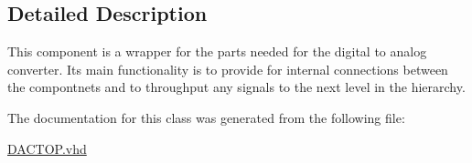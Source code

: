\subsection{Detailed Description}
This component is a wrapper for the parts needed for the digital to analog converter. Its main functionality is to provide for internal connections between the compontnets and to throughput any signals to the next level in the hierarchy. 

The documentation for this class was generated from the following file\-:\begin{DoxyCompactItemize}
\item 
\hyperlink{DACTOP_8vhd}{D\-A\-C\-T\-O\-P.\-vhd}\end{DoxyCompactItemize}
